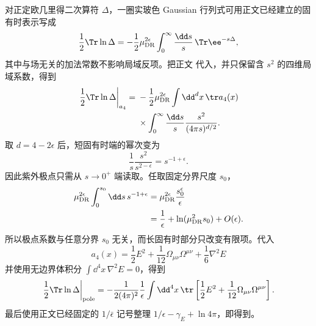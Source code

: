 \begin{derivation}

对正定欧几里得二次算符 $\Delta$，一圈实玻色 Gaussian 行列式可用正文已经建立的固有时表示写成
\[
\frac12\Tr\ln\Delta
=-\frac12\mu_{\rm DR}^{2\epsilon}
\int_0^\infty\frac{\dd s}{s}\,
\Tr \ee^{-s\Delta},
\]
其中与场无关的加法常数不影响局域反项。把正文 代入，并只保留含 $s^2$ 的四维局域系数，得到
\begin{align*}
\left.\frac12\Tr\ln\Delta\right|_{a_4}
={}&-\frac12\mu_{\rm DR}^{2\epsilon}
\int\dd^d x\,
\tr a_4(x)\\
&\times\int_0^\infty\frac{\dd s}{s}
\frac{s^2}{(4\pi s)^{d/2}}.
\end{align*}
取 $d=4-2\epsilon$ 后，短固有时端的幂次变为
\[
\frac1s\frac{s^2}{s^{2-\epsilon}}
=s^{-1+\epsilon}.
\]
因此紫外极点只需从 $s\to0^+$ 端读取。任取固定分界尺度 $s_0$，
\begin{align*}
\mu_{\rm DR}^{2\epsilon}
\int_0^{s_0}\dd s\,s^{-1+\epsilon}
&=\mu_{\rm DR}^{2\epsilon}
\frac{s_0^\epsilon}{\epsilon}\\
&=\frac1\epsilon
+\ln(\mu_{\rm DR}^2s_0)+O(\epsilon).
\end{align*}
所以极点系数与任意分界 $s_0$ 无关，而长固有时部分只改变有限项。代入
\[
 a_4(x)
 =\frac12E^2
 +\frac1{12}\Omega_{\mu\nu}\Omega^{\mu\nu}
 +\frac16\nabla^2E
\]
并使用无边界体积分
\(
\int\dd^4 x\,\nabla^2E=0
\)，得到
\[
\left.\frac12\Tr\ln\Delta\right|_{\rm pole}
=-\frac1{2(4\pi)^2}\frac1\epsilon
\int\dd^4 x\,
\tr\left[
\frac12E^2+\frac1{12}\Omega_{\mu\nu}\Omega^{\mu\nu}
\right].
\]
最后使用正文已经固定的 $1/\bar\epsilon$ 记号整理 $1/\epsilon-\gamma_E+\ln4\pi$，即得到。
\end{derivation}
